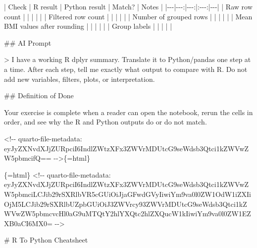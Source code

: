 \documentclass[
  letterpaper,
  DIV=11,
  numbers=noendperiod,
  oneside]{scrreprt}
\newenvironment{Shaded}{\begin{snugshade}}{\end{snugshade}}
\newcommand{\AttributeTok}[1]{\textcolor[rgb]{0.40,0.45,0.13}{#1}}
\newcommand{\FunctionTok}[1]{\textcolor[rgb]{0.28,0.35,0.67}{#1}}
\newcommand{\InformationTok}[1]{\textcolor[rgb]{0.37,0.37,0.37}{#1}}
\newcommand{\NormalTok}[1]{\textcolor[rgb]{0.00,0.23,0.31}{#1}}
\newcommand{\PreprocessorTok}[1]{\textcolor[rgb]{0.68,0.00,0.00}{#1}}
\begin{document}
\begin{Shaded}
\begin{Highlighting}[numbers=left,,]
\PreprocessorTok{|}\NormalTok{ Check }\PreprocessorTok{|}\NormalTok{ R result }\PreprocessorTok{|}\NormalTok{ Python result }\PreprocessorTok{|}\NormalTok{ Match? }\PreprocessorTok{|}\NormalTok{ Notes }\PreprocessorTok{|}
\PreprocessorTok{|{-}{-}{-}|{-}{-}{-}:|{-}{-}{-}:|:{-}{-}{-}:|{-}{-}{-}|}
\PreprocessorTok{|}\NormalTok{ Raw row count }\PreprocessorTok{|}  \PreprocessorTok{|}  \PreprocessorTok{|}  \PreprocessorTok{|}  \PreprocessorTok{|}
\PreprocessorTok{|}\NormalTok{ Filtered row count }\PreprocessorTok{|}  \PreprocessorTok{|}  \PreprocessorTok{|}  \PreprocessorTok{|}  \PreprocessorTok{|}
\PreprocessorTok{|}\NormalTok{ Number of grouped rows }\PreprocessorTok{|}  \PreprocessorTok{|}  \PreprocessorTok{|}  \PreprocessorTok{|}  \PreprocessorTok{|}
\PreprocessorTok{|}\NormalTok{ Mean BMI values after rounding }\PreprocessorTok{|}  \PreprocessorTok{|}  \PreprocessorTok{|}  \PreprocessorTok{|}  \PreprocessorTok{|}
\PreprocessorTok{|}\NormalTok{ Group labels }\PreprocessorTok{|}  \PreprocessorTok{|}  \PreprocessorTok{|}  \PreprocessorTok{|}  \PreprocessorTok{|}

\FunctionTok{\#\# AI Prompt}

\AttributeTok{\textgreater{} I have a working R }\InformationTok{\textasciigrave{}dplyr\textasciigrave{}}\AttributeTok{ summary. Translate it to Python/pandas one step at a time. After each step, tell me exactly what output to compare with R. Do not add new variables, filters, plots, or interpretation.}

\FunctionTok{\#\# Definition of Done}

\NormalTok{Your exercise is complete when a reader can open the notebook, rerun the cells in order, and see why the R and Python outputs do or do not match.}


\InformationTok{\textasciigrave{}\textless{}!{-}{-} quarto{-}file{-}metadata: eyJyZXNvdXJjZURpciI6IndlZWtzXFx3ZWVrMDUtcG9seWdsb3Qtci1kZWVwZW5pbmcifQ== {-}{-}\textgreater{}\textasciigrave{}}\NormalTok{\{=html\}}

\InformationTok{\textasciigrave{}\textasciigrave{}\textasciigrave{}\{=html\}}
\InformationTok{\textless{}!{-}{-} quarto{-}file{-}metadata: eyJyZXNvdXJjZURpciI6IndlZWtzXFx3ZWVrMDUtcG9seWdsb3Qtci1kZWVwZW5pbmciLCJib29rSXRlbVR5cGUiOiJjaGFwdGVyIiwiYm9va0l0ZW1OdW1iZXIiOjM5LCJib29rSXRlbUZpbGUiOiJ3ZWVrcy93ZWVrMDUtcG9seWdsb3Qtci1kZWVwZW5pbmcvcHl0aG9uMTQtY2hlYXQtc2hlZXQucW1kIiwiYm9va0l0ZW1EZXB0aCI6MX0= {-}{-}\textgreater{}}
\InformationTok{\textasciigrave{}\textasciigrave{}\textasciigrave{}}

\FunctionTok{\# R To Python Cheatsheet }



\end{Highlighting}
\end{Shaded}
\end{document}
